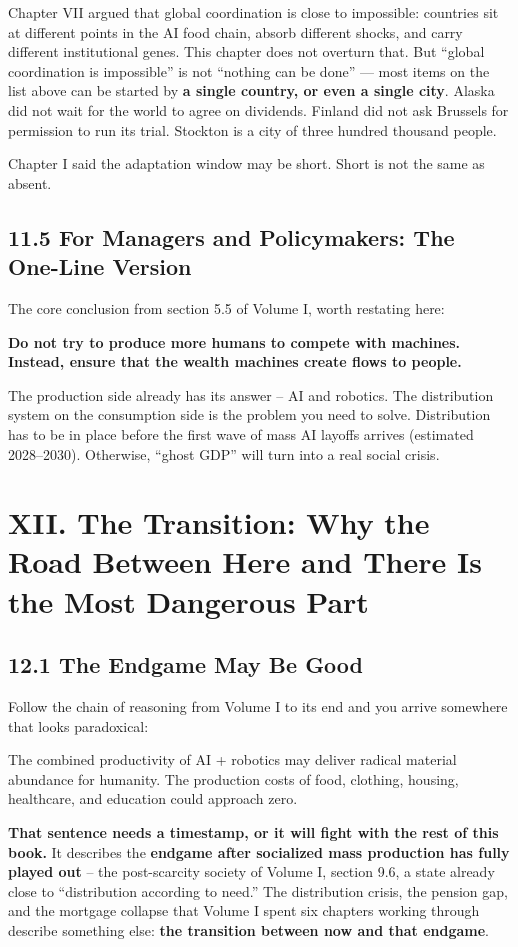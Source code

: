 \documentclass[11pt,a4paper]{article}
\begin{document}
Chapter VII argued that global coordination is close to impossible: countries sit at different points in the AI food chain, absorb different shocks, and carry different institutional genes. This chapter does not overturn that. But ``global coordination is impossible'' is not ``nothing can be done'' --- most items on the list above can be started by \textbf{a single country, or even a single city}. Alaska did not wait for the world to agree on dividends. Finland did not ask Brussels for permission to run its trial. Stockton is a city of three hundred thousand people.

Chapter I said the adaptation window may be short. Short is not the same as absent.

\subsection{11.5 For Managers and Policymakers: The One-Line Version}

The core conclusion from section 5.5 of Volume I, worth restating here:

\textbf{Do not try to produce more humans to compete with machines. Instead, ensure that the wealth machines create flows to people.}

The production side already has its answer -- AI and robotics. The distribution system on the consumption side is the problem you need to solve. Distribution has to be in place before the first wave of mass AI layoffs arrives (estimated 2028--2030). Otherwise, ``ghost GDP'' will turn into a real social crisis.

\section{XII. The Transition: Why the Road Between Here and There Is the Most Dangerous Part}

\subsection{12.1 The Endgame May Be Good}

Follow the chain of reasoning from Volume I to its end and you arrive somewhere that looks paradoxical:

The combined productivity of AI + robotics may deliver radical material abundance for humanity. The production costs of food, clothing, housing, healthcare, and education could approach zero.

\textbf{That sentence needs a timestamp, or it will fight with the rest of this book.} It describes the \textbf{endgame after socialized mass production has fully played out} -- the post-scarcity society of Volume I, section 9.6, a state already close to ``distribution according to need.'' The distribution crisis, the pension gap, and the mortgage collapse that Volume I spent six chapters working through describe something else: \textbf{the transition between now and that endgame}.
\end{document}
